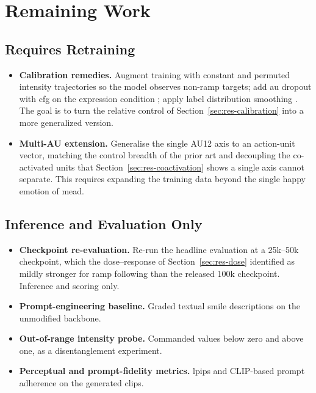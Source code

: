\section{Remaining Work}\label{sec:sched-remaining}

\subsection{Requires Retraining}\label{subsec:sched-retrain}


\begin{itemize}
    \item \textbf{Calibration remedies.} Augment training with constant and permuted intensity trajectories so the model observes non-ramp targets; add \gls{au} dropout with \gls{cfg} on the expression condition \citep{wei2025magicface}; apply label distribution smoothing \citep{varanka2024fineface}. The goal is to turn the relative control of Section~\ref{sec:res-calibration} into a more generalized version.
    \item \textbf{Multi-AU extension.} Generalise the single AU12 axis to an action-unit vector, matching the control breadth of the prior art and decoupling the co-activated units that Section~\ref{sec:res-coactivation} shows a single axis cannot separate. This requires expanding the training data beyond the single happy emotion of \gls{mead}.
\end{itemize}

\subsection{Inference and Evaluation Only}\label{subsec:sched-eval}


\begin{itemize}
    \item \textbf{Checkpoint re-evaluation.} Re-run the headline evaluation at a 25k--50k checkpoint, which the dose--response of Section~\ref{sec:res-dose} identified as mildly stronger for ramp following than the released 100k checkpoint. Inference and scoring only.
    \item \textbf{Prompt-engineering baseline.} Graded textual smile descriptions on the unmodified backbone.
    \item \textbf{Out-of-range intensity probe.} Commanded values below zero and above one, as a disentanglement experiment.
    \item \textbf{Perceptual and prompt-fidelity metrics.} \gls{lpips} \citep{zhang2018lpips} and CLIP-based prompt adherence on the generated clips.
\end{itemize}

